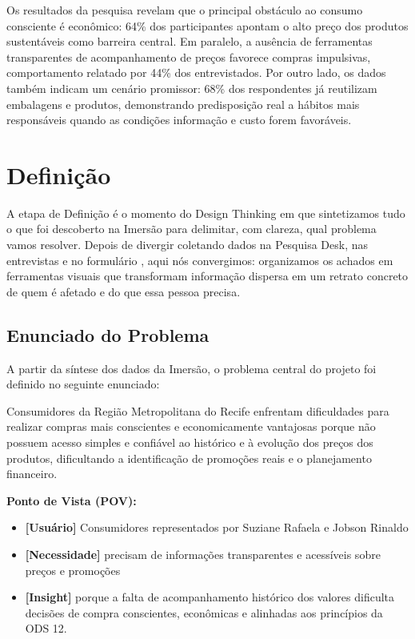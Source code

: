 \documentclass[12pt, a4paper]{article}
\newcommand{\novaSecao}[1]{\clearpage\vspace*{2.2cm}\section{#1}}
\newenvironment{citacaoBox}{%
  \par\vspace{6pt}%
  \def\FrameCommand{{\color{wineSoft}\vrule width 2pt}\hspace{12pt}}%
  \MakeFramed{\advance\hsize-\width\FrameRestore}%
  \small\itshape\color{ink}%
}{%
  \par\endMakeFramed\vspace{6pt}%
}
\begin{document}
Os resultados da pesquisa revelam que o principal obstáculo ao consumo consciente é econômico: 64\% dos participantes apontam o alto preço dos produtos sustentáveis como barreira central. Em paralelo, a ausência de ferramentas transparentes de acompanhamento de preços favorece compras impulsivas, comportamento relatado por 44\% dos entrevistados. Por outro lado, os dados também indicam um cenário promissor: 68\% dos respondentes já reutilizam embalagens e produtos, demonstrando predisposição real a hábitos mais responsáveis quando as condições \textemdash{} informação e custo \textemdash{} forem favoráveis.

\novaSecao{Definição}

A etapa de Definição é o momento do Design Thinking em que sintetizamos tudo o que foi descoberto na Imersão para delimitar, com clareza, qual problema vamos resolver. Depois de divergir \textemdash{} coletando dados na Pesquisa Desk, nas entrevistas e no formulário \textemdash{}, aqui nós convergimos: organizamos os achados em ferramentas visuais que transformam informação dispersa em um retrato concreto de quem é afetado e do que essa pessoa precisa.

\subsection{Enunciado do Problema}

A partir da síntese dos dados da Imersão, o problema central do projeto foi definido no seguinte enunciado:

\begin{citacaoBox}
Consumidores da Região Metropolitana do Recife enfrentam dificuldades para realizar compras mais conscientes e economicamente vantajosas porque não possuem acesso simples e confiável ao histórico e à evolução dos preços dos produtos, dificultando a identificação de promoções reais e o planejamento financeiro.
\end{citacaoBox}

\noindent\textbf{Ponto de Vista (POV):}

\begin{itemize}[leftmargin=1.4em, itemsep=4pt, label=\textcolor{wineSoft}{\textbf{\textbullet}}]
  \item \textbf{[Usuário]} Consumidores representados por Suziane Rafaela e Jobson Rinaldo
  \item \textbf{[Necessidade]} precisam de informações transparentes e acessíveis sobre preços e promoções
  \item \textbf{[Insight]} porque a falta de acompanhamento histórico dos valores dificulta decisões de compra conscientes, econômicas e alinhadas aos princípios da ODS 12.
\end{itemize}
\end{document}
